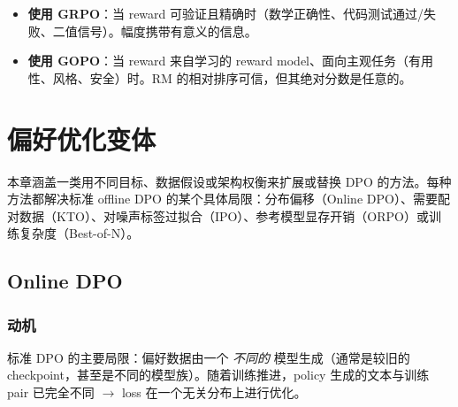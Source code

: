 \begin{intuitionbox}
\begin{itemize}
  \item \textbf{使用 GRPO}：当 reward 可验证且精确时（数学正确性、代码测试通过/失败、二值信号）。幅度携带有意义的信息。
  \item \textbf{使用 GOPO}：当 reward 来自学习的 reward model、面向主观任务（有用性、风格、安全）时。RM 的相对排序可信，但其绝对分数是任意的。
\end{itemize}
\end{intuitionbox}

\chapter{偏好优化变体}
\label{ch:po-variants}

本章涵盖一类用不同目标、数据假设或架构权衡来扩展或替换 DPO 的方法。每种方法都解决标准 offline DPO 的某个具体局限：分布偏移（Online DPO）、需要配对数据（KTO）、对噪声标签过拟合（IPO）、参考模型显存开销（ORPO）或训练复杂度（Best-of-N）。

\section{Online DPO}
\label{sec:online-dpo}

\subsection{动机}
\label{motivation-dup3}

标准 DPO 的主要局限：偏好数据由一个 \emph{不同的} 模型生成（通常是较旧的 checkpoint，甚至是不同的模型族）。随着训练推进，policy 生成的文本与训练 pair 已完全不同 $\rightarrow$ loss 在一个无关分布上进行优化。


